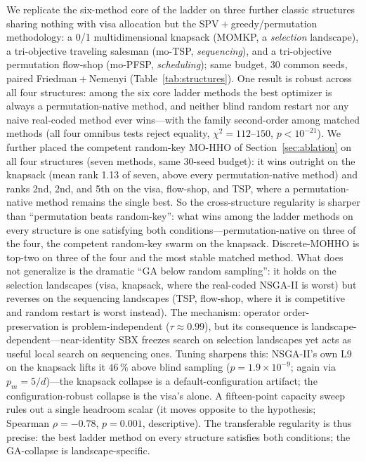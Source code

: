 \documentclass[runningheads]{llncs}
\begin{document}
We replicate the six-method core of the ladder on three further classic structures sharing nothing with visa allocation but the SPV${}+{}$greedy/permutation methodology: a 0/1 multidimensional knapsack (MOMKP, a \emph{selection} landscape), a tri-objective traveling salesman (mo-TSP, \emph{sequencing}), and a tri-objective permutation flow-shop (mo-PFSP, \emph{scheduling}); same budget, 30 common seeds, paired Friedman${}+{}$Nemenyi (Table~\ref{tab:structures}). One result is robust across all four structures: among the six core ladder methods the best optimizer is always a permutation-native method, and neither blind random restart nor any naive real-coded method ever wins---with the family second-order among matched methods (all four omnibus tests reject equality, $\chi^2=112$--$150$, $p<10^{-21}$). We further placed the competent random-key MO-HHO of Section~\ref{sec:ablation} on all four structures (seven methods, same 30-seed budget): it wins outright on the knapsack (mean rank 1.13 of seven, above every permutation-native method) and ranks 2nd, 2nd, and 5th on the visa, flow-shop, and TSP, where a permutation-native method remains the single best. So the cross-structure regularity is sharper than ``permutation beats random-key'': what wins among the ladder methods on every structure is one satisfying both conditions---permutation-native on three of the four, the competent random-key swarm on the knapsack. Discrete-MOHHO is top-two on three of the four and the most stable matched method. What does not generalize is the dramatic ``GA below random sampling'': it holds on the selection landscapes (visa, knapsack, where the real-coded NSGA-II is worst) but reverses on the sequencing landscapes (TSP, flow-shop, where it is competitive and random restart is worst instead). The mechanism: operator order-preservation is problem-independent ($\tau\approx0.99$), but its consequence is landscape-dependent---near-identity SBX freezes search on selection landscapes yet acts as useful local search on sequencing ones. Tuning sharpens this: NSGA-II's own L9 on the knapsack lifts it $46\,\%$ above blind sampling ($p=1.9\times10^{-9}$; again via $p_m{=}5/d$)---the knapsack collapse is a default-configuration artifact; the configuration-robust collapse is the visa's alone. A fifteen-point capacity sweep rules out a single headroom scalar (it moves opposite to the hypothesis; Spearman $\rho=-0.78$, $p=0.001$, descriptive). The transferable regularity is thus precise: the best ladder method on every structure satisfies both conditions; the GA-collapse is landscape-specific.
\end{document}
